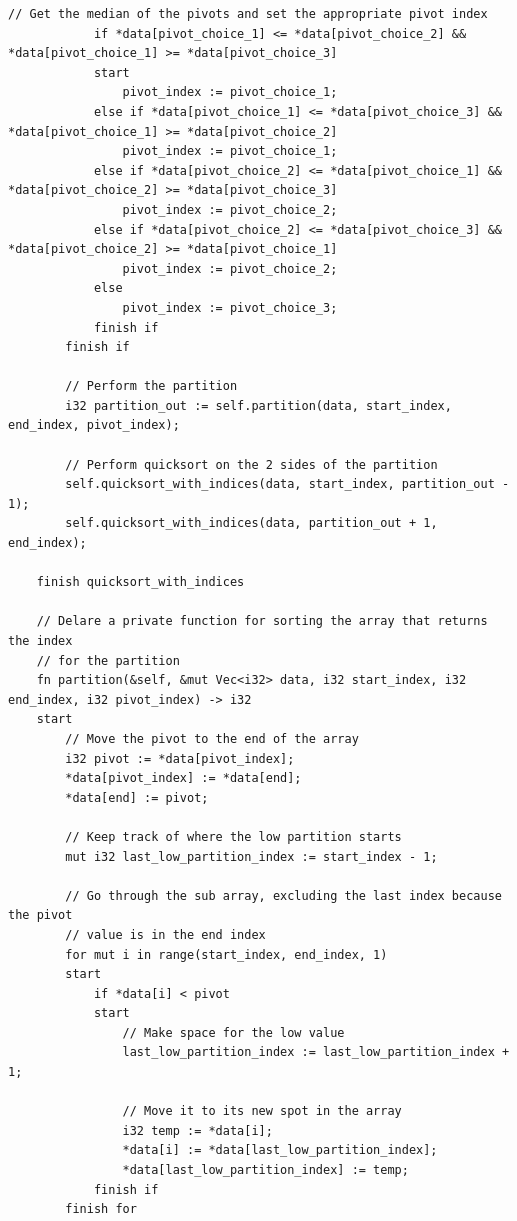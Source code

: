 \documentclass[letterpaper, 10pt, DIV=13]{scrartcl}
\numberwithin{equation}{section}
\numberwithin{figure}{section}
\numberwithin{table}{section}
\begin{document}
\begin{lstlisting}[caption = SortsAndShuffles.rez, frame = single, nolol]
            // Get the median of the pivots and set the appropriate pivot index
            if *data[pivot_choice_1] <= *data[pivot_choice_2] && *data[pivot_choice_1] >= *data[pivot_choice_3]
            start
                pivot_index := pivot_choice_1;
            else if *data[pivot_choice_1] <= *data[pivot_choice_3] && *data[pivot_choice_1] >= *data[pivot_choice_2]
                pivot_index := pivot_choice_1;
            else if *data[pivot_choice_2] <= *data[pivot_choice_1] && *data[pivot_choice_2] >= *data[pivot_choice_3]
                pivot_index := pivot_choice_2;
            else if *data[pivot_choice_2] <= *data[pivot_choice_3] && *data[pivot_choice_2] >= *data[pivot_choice_1]
                pivot_index := pivot_choice_2;
            else
                pivot_index := pivot_choice_3;
            finish if
        finish if
        
        // Perform the partition
        i32 partition_out := self.partition(data, start_index, end_index, pivot_index);

        // Perform quicksort on the 2 sides of the partition
        self.quicksort_with_indices(data, start_index, partition_out - 1);
        self.quicksort_with_indices(data, partition_out + 1, end_index);

    finish quicksort_with_indices

    // Delare a private function for sorting the array that returns the index
    // for the partition
    fn partition(&self, &mut Vec<i32> data, i32 start_index, i32 end_index, i32 pivot_index) -> i32
    start
        // Move the pivot to the end of the array
        i32 pivot := *data[pivot_index];
        *data[pivot_index] := *data[end];
        *data[end] := pivot;

        // Keep track of where the low partition starts
        mut i32 last_low_partition_index := start_index - 1;

        // Go through the sub array, excluding the last index because the pivot
        // value is in the end index
        for mut i in range(start_index, end_index, 1)
        start
            if *data[i] < pivot
            start
                // Make space for the low value
                last_low_partition_index := last_low_partition_index + 1;

                // Move it to its new spot in the array
                i32 temp := *data[i];
                *data[i] := *data[last_low_partition_index];
                *data[last_low_partition_index] := temp;
            finish if
        finish for


\end{lstlisting}
\end{document}
